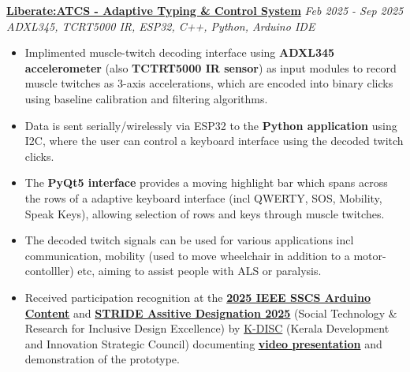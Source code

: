 \documentclass[a4paper]{article}
\begin{document}
\textbf{\href{https://liberate-atcs.vercel.app/}{Liberate:ATCS - Adaptive Typing \& Control System}} \hfill \textit{Feb 2025 - Sep 2025}\\
{\sl ADXL345, TCRT5000 IR, ESP32, C++, Python, Arduino IDE}
\begin{itemize} \itemsep 1pt
    \item Implimented muscle-twitch decoding interface using \textbf{ADXL345 accelerometer} (also \textbf{TCTRT5000 IR sensor}) as input modules to record muscle twitches as 3-axis accelerations, which are encoded into binary clicks using baseline calibration and filtering algorithms.
    \item Data is sent serially/wirelessly via ESP32 to the \textbf{Python application} using I2C, where the user can control a keyboard interface using the decoded twitch clicks.
    \item The \textbf{PyQt5 interface} provides a moving highlight bar which spans across the rows of a adaptive keyboard interface (incl QWERTY, SOS, Mobility, Speak Keys), allowing selection of rows and keys through muscle twitches.
    \item  The decoded twitch signals can be used for various applications incl communication, mobility (used to move wheelchair in addition to a motor-contolller) etc, aiming to assist people with ALS or paralysis.
    \item Received participation recognition at the \textbf{\href{https://sscs.ieee.org/education/sscs-arduino-contest/}{2025 IEEE SSCS Arduino Content}} and \textbf{\href{https://stridedesignathon.ieee-link.org/}{STRIDE Assitive Designation 2025}} (Social Technology \& Research for Inclusive Design Excellence) by \href{https://kdisc.kerala.gov.in/en/}{K-DISC} (Kerala Development and Innovation Strategic Council) documenting \textbf{\href{https://youtu.be/9NmNVjKmtew?si=vOsgkYYBrDFDhQ74}{video presentation}} and demonstration of the prototype.
\end{itemize}
\newpage
\end{document}
